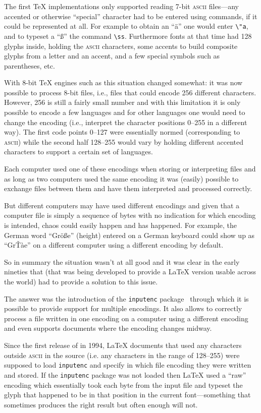 \documentclass{ltnews}
\providecommand\acro[1]{\textsc{#1}}
\providecommand\pkg[1]{\texttt{#1}}
\begin{document}
The first \TeX{} implementations only supported reading 7-bit
\acro{ascii} files---any accented or otherwise ``special'' character
had to be entered using commands, if it could be represented at
all. For example to obtain an ``\"a'' one would enter \verb=\"a=, and to
typeset a ``\ss'' the command \verb=\ss=. Furthermore fonts at that
time had 128 glyphs inside, holding the \acro{ascii} characters, some
accents to build composite glyphs from a letter and an accent, and a
few special symbols such as parentheses, etc.

With 8-bit \TeX{} engines such as  this situation changed
somewhat: it was now possible to process 8-bit files, i.e., files that
could encode 256 different characters. However, 256 is still a fairly
small number and with this limitation it is only possible to encode a
few languages and for other languages one would need to change the
encoding (i.e., interpret the character positions 0--255 in a
different way). The first code points 0--127 were essentially normed
(corresponding to \acro{ascii}) while the second half 128--255 would
vary by holding different accented characters to support a certain set
of languages.

Each computer used one of these encodings when storing or interpreting
files and as long as two computers used the same encoding it was
(easily) possible to exchange files between them and have them
interpreted and processed correctly.

But different computers may have used different encodings and given
that a computer file is simply a sequence of bytes with no indication for
which encoding is intended, chaos could easily happen and has
happened. For example, the German word ``Gr\"o\ss e'' (height) entered on a
German keyboard could show up as ``Gr\v T\`ae'' on a different
computer using a different encoding by default.

So in summary the situation wasn't at all good and it was clear in
the early nineties that \LaTeXe{} (that was being developed to provide
a \LaTeX{} version usable across the world) had to provide a solution
to this issue.

The \LaTeXe{} answer was the introduction of the \pkg{inputenc}
package~\cite{Mittelbach:Brno95} through which it is possible to
provide support for multiple encodings. It also allows to correctly
process a file written in one encoding on a computer using a different
encoding and even supports documents where the encoding changes
midway.

Since the first release of \LaTeXe{} in 1994, \LaTeX{} documents that
used any characters outside \acro{ascii} in the source (i.e. any
characters in the range of 128--255) were supposed to load
\pkg{inputenc} and specify in which file encoding they were
written and stored.
%
If the \pkg{inputenc} package was not loaded then \LaTeX{} used a
``raw'' encoding which essentially took each byte from the input file
and typeset the glyph that happened to be in that position in the
current font---something that sometimes produces the right result but
often enough will not.
\end{document}
